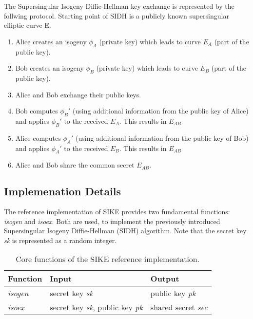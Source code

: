 The Supersingular Isogeny Diffie-Hellman key exchange is represented by the follwing protocol.
Starting point of \gls{SIDH} is a publicly known supersingular elliptic curve E. 

\begin{enumerate}
\item Alice creates an isogeny $\phi_A$ (private key) which leads to curve $E_A$ (part of the public key).
\item Bob creates an isogeny $\phi_B$ (private key) which leads to curve $E_B$ (part of the public key).
\item Alice and Bob exchange their public keys.
\item Bob computes $\phi_B'$ (using additional information from the public key of Alice) and applies $\phi_B'$ to the received $E_A$. This results in $E_{AB}$
\item Alice computes $\phi_A'$ (using additional information from the public key of Bob) and applies $\phi_A'$ to the received $E_B$. This results in $E_{AB}$
\item Alice and Bob share the  common secret $E_{AB}$.
\end{enumerate}

\subsection{Implemenation Details}

The reference implementation of \gls{SIKE} \parencite{sike2020spec} provides two fundamental functions: \textit{isogen} and \textit{isoex}. Both are used, to implement the previously introduced Supersingular Isogeny Diffie-Hellman (\gls{SIDH}) algorithm. Note that the secret key \textit{sk} is represented as a random integer.
\\

\begin{table}[H]
  \centering
  \begin{tabular}{|K{3cm}|K{3cm}|K{4cm}|}
	\hline
      \textbf{Function} & \textbf{Input} & \textbf{Output} \\
	\hline
      \textit{isogen} & secret key \textit{sk} & public key \textit{pk} \\
     \hline
      \textit{isoex} & secret key \textit{sk}, public key \textit{pk} & shared secret \textit{sec}\\
     \hline
  \end{tabular}
   \caption[Core functions of the \gls{SIKE} reference implementation]{Core functions of the \gls{SIKE} reference implementation.}\label{tab:sike_core_functions}
\end{table}

